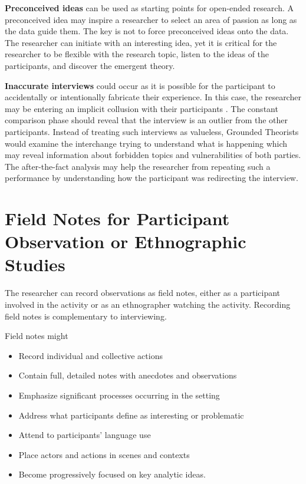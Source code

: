\textbf{Preconceived ideas} can be used as starting points for open-ended research. A preconceived idea may inspire a researcher to select an area of passion as long as the data guide them. The key is not to force preconceived ideas onto the data. The researcher can initiate with an interesting idea, yet it is critical for the researcher to be flexible with the research topic, listen to the ideas of the participants, and discover the emergent theory. 

\textbf{Inaccurate interviews} could occur as it is possible for the participant to accidentally or intentionally fabricate their experience. In this case, the researcher may be entering an implicit collusion with their participants \cite{Yanos2008CollusiveObjectification}. The constant comparison phase should reveal that the interview is an outlier from the other participants.  Instead of treating such interviews as valueless, Grounded Theorists would examine the interchange trying to understand what is happening which may reveal information about forbidden topics and vulnerabilities of both parties. The after-the-fact analysis may help the researcher from repeating such a performance by understanding how the participant was redirecting the interview. 

\section{Field Notes for Participant Observation or Ethnographic Studies}
The researcher can record observations as field notes, either as a participant involved in the activity or as an ethnographer watching the activity. Recording field notes is complementary to interviewing. 

Field notes might
\begin{itemize}
\item Record individual and collective actions 
\item Contain full, detailed notes with anecdotes and observations 
\item Emphasize significant processes occurring in the setting 
\item Address what participants define as interesting or problematic 
\item Attend to participants' language use 
\item Place actors and actions in scenes and contexts 
\item Become progressively focused on key analytic ideas. \cite{Charmaz}
\end{itemize}

